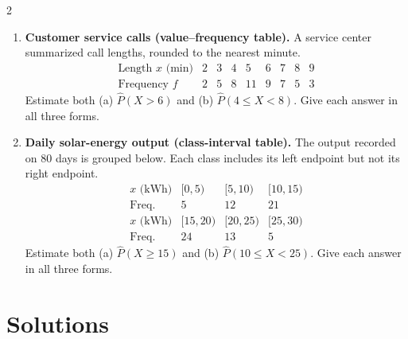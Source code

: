 \begin{multicols}{2}
\begin{enumerate}
		\item \textbf{Customer service calls (value--frequency table).}
		A service center summarized call lengths, rounded to the nearest minute.
		\[
		\begin{array}{c|rrrrrrrr}
			\text{Length }x\text{ (min)}&2&3&4&5&6&7&8&9\\ \hline
			\text{Frequency }f&2&5&8&11&9&7&5&3
		\end{array}
		\]
		Estimate both (a) $\widehat P(X>6)$ and
		(b) $\widehat P(4\leq X<8)$. Give each answer in all three forms.

		\item \textbf{Daily solar-energy output (class-interval table).}
		The output recorded on 80 days is grouped below. Each class includes
		its left endpoint but not its right endpoint.
		\[
		\begin{array}{c|rrr}
			\text{$x$ (kWh)} & [0,5) & [5,10) & [10,15) \\ \hline
			\text{Freq.}      & 5     & 12     & 21        \\[1mm]
			\text{$x$ (kWh)} & [15,20) & [20,25) & [25,30) \\ \hline
			\text{Freq.}      & 24      & 13      & 5
		\end{array}
		\]
		Estimate both (a) $\widehat P(X\geq15)$ and
		(b) $\widehat P(10\leq X<25)$. Give each answer in all three forms.
	\end{enumerate}
	
	\end{multicols}

\newpage
\restoregeometry

\vspace*{-15mm}

\section{Solutions}

\setlength{\columnseprule}{0.4pt}

